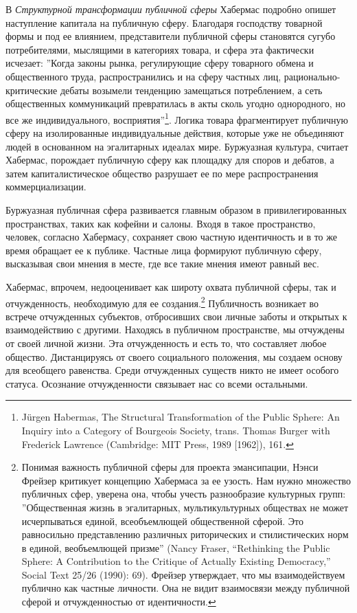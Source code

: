 \documentclass[12pt]{book}
\begin{document}
В \textit{Структурной трансформации публичной сферы} Хабермас подробно опишет наступление капитала на публичную сферу. Благодаря господству товарной формы и под ее влиянием, представители публичной сферы становятся сугубо потребителями, мыслящими в категориях товара, и сфера эта фактически исчезает: ''Когда законы рынка, регулирующие сферу товарного обмена и общественного труда, распространились и на сферу частных лиц, рационально-критические дебаты возымели тенденцию замещаться потреблением, а сеть общественных коммуникаций превратилась в акты сколь угодно однородного, но все же индивидуального, восприятия''\footnote{Jürgen Habermas, The Structural Transformation of the Public Sphere: An Inquiry into a Category of Bourgeois Society, trans. Thomas Burger with Frederick Lawrence (Cambridge: MIT Press, 1989 [1962]), 161.}. Логика товара фрагментирует публичную сферу на изолированные индивидуальные действия, которые уже не объединяют людей в основанном на эгалитарных идеалах мире. Буржуазная культура, считает Хабермас, порождает публичную сферу как площадку для споров и дебатов, а затем капиталистическое общество разрушает ее по мере распространения коммерциализации.

Буржуазная публичная сфера развивается главным образом в привилегированных пространствах, таких как кофейни и салоны. Входя в такое пространство, человек, согласно Хабермасу, сохраняет свою частную идентичность и в то же время обращает ее к публике. Частные лица формируют публичную сферу, высказывая свои мнения в месте, где все такие мнения имеют равный вес.

Хабермас, впрочем, недооценивает как широту охвата публичной сферы, так и отчужденность, необходимую для ее создания.\footnote{Понимая важность публичной сферы для проекта эмансипации, Нэнси Фрейзер критикует концепцию Хабермаса за ее узость. Нам нужно множество публичных сфер, уверена она, чтобы учесть разнообразие культурных групп: ''Общественная жизнь в эгалитарных, мультикультурных обществах не может исчерпываться единой, всеобъемлющей общественной сферой. Это равносильно представлению различных риторических и стилистических норм в единой, веобъемлющей призме'' (Nancy Fraser, “Rethinking the Public Sphere: A Contribution to the Critique of Actually Existing Democracy,” Social Text 25/26 (1990): 69). Фрейзер утверждает, что мы взаимодействуем публично как частные личности. Она не видит взаимосвязи между публичной сферой и отчужденностью от идентичности.} Публичность возникает во встрече отчужденных субъектов, отбросивших свои личные заботы и открытых к взаимодействию с другими. Находясь в публичном пространстве, мы отчуждены от своей личной жизни. Эта отчужденность и есть то, что составляет любое общество. Дистанцируясь от своего социального положения, мы создаем основу для всеобщего равенства. Среди отчужденных существ никто не имеет особого статуса. Осознание отчужденности связывает нас со всеми остальными.
\end{document}

